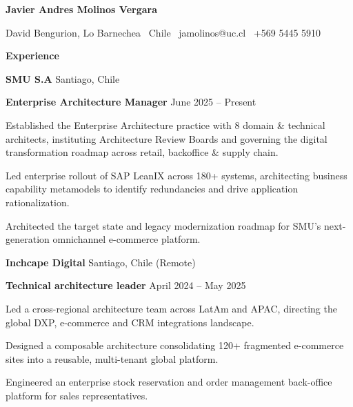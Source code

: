 \documentclass[11pt]{article}
\let\olditemize\itemize
\let\endolditemize\enditemize
\renewenvironment{itemize}[1][]{%
  \olditemize
  \setlength{\itemsep}{0pt}%
  \setlength{\parskip}{0pt}%
  \setlength{\parsep}{0pt}%
  \setlength{\partopsep}{0pt}%
}{%
  \endolditemize
}
\begin{document}
\begin{center}
    \textbf{Javier Andres Molinos Vergara}\\ 
    \hrulefill
\end{center}

\begin{center}
    David Bengurion, Lo Barnechea \textbullet \ Chile \textbullet \ jamolinos@uc.cl \textbullet \ +569 5445 5910
\end{center}

\vspace{0.5pt}





\begin{center}
    \textbf{Experience}
\end{center}
\textbf{SMU S.A} \hfill Santiago, Chile

\textbf{Enterprise Architecture Manager} \hfill June 2025 -- Present
\begin{itemize}[noitemsep, topsep=0pt, partopsep=0pt, parsep=0pt]
    \item Established the Enterprise Architecture practice with 8 domain \& technical architects, instituting Architecture Review Boards and governing the digital transformation roadmap across retail, backoffice \& supply chain.
    \item Led enterprise rollout of SAP LeanIX across 180+ systems, architecting business capability metamodels to identify redundancies and drive application rationalization.
    \item Architected the target state and legacy modernization roadmap for SMU's next-generation omnichannel e-commerce platform.
\end{itemize}

\vspace{12pt}

\textbf{Inchcape Digital} \hfill Santiago, Chile (Remote)

\textbf{Technical architecture leader} \hfill April 2024 -- May 2025
\begin{itemize}[noitemsep, topsep=0pt, partopsep=0pt, parsep=0pt]
    \item Led a cross-regional architecture team across LatAm and APAC, directing the global DXP, e-commerce and CRM integrations landscape.
    \item Designed a composable architecture consolidating 120+ fragmented e-commerce sites into a reusable, multi-tenant global platform.
    \item Engineered an enterprise stock reservation and order management back-office platform for sales representatives.
\end{itemize}
\end{document}
